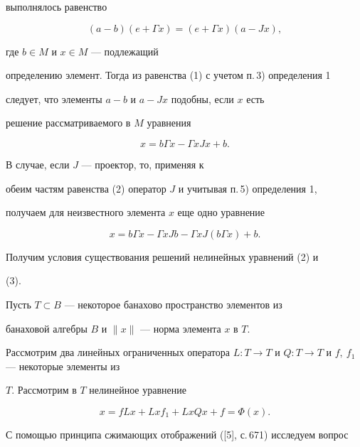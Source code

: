 выполнялось равенство


\begin{equation}


(a-b)(e+\Gamma x)=(e+\Gamma x)(a-Jx),


\end{equation}


где $b\in M$ и $x\in M$ --- подлежащий


определению элемент. Тогда из равенства (1) с учетом п.\,3) определения 1


следует, что элементы $a-b$ и $a-Jx$ подобны, если $x$ есть


решение рассматриваемого в $M$ уравнения


\begin{equation}


x=b\Gamma x-\Gamma xJx+b.


\end{equation}


В случае, если $J$ --- проектор, то, применяя к


обеим частям равенства (2) оператор $J$ и учитывая п.\,5) определения 1,


получаем для неизвестного элемента $x$ еще одно уравнение


\begin{equation}


x=b\Gamma x-\Gamma xJb-\Gamma xJ(b\Gamma x)+b.


\end{equation}


Получим условия существования решений нелинейных уравнений (2) и


(3). 





Пусть $T\subset B$ --- некоторое банахово пространство элементов из


банаховой алгебры $B$ и $\|x\|$ --- норма элемента $x$ в $T$.


Рассмотрим два линейных ограниченных оператора $L:T\rightarrow


T$ и $Q:T\rightarrow T$ и $f,\ f_1$ --- некоторые элементы из


$T$. Рассмотрим в $T$ нелинейное уравнение


\begin{equation}


x=fLx+Lxf_1+LxQx+f=\Phi(x).


\end{equation}


С помощью принципа сжимающих отображений ([5], с.\,671) исследуем вопрос



